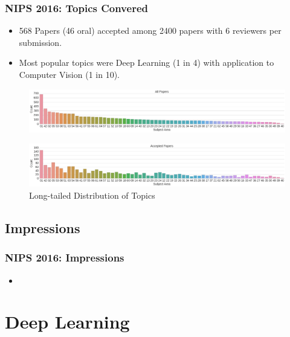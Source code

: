 \documentclass[11pt,
               hyperref={colorlinks,citecolor=pink,linkcolor=red,urlcolor=blue}
               ]{beamer}
\begin{document}
  \begin{frame}
    \frametitle{NIPS 2016: Topics Convered}

    \begin{itemize}
      \item 568 Papers (46 oral) accepted among 2400 papers with 6 reviewers per submission.
      \item Most popular topics were Deep Learning (1 in 4) with application to Computer Vision (1 in 10).
    \end{itemize}

    \begin{figure}
      \centering
      \includegraphics[width=\textwidth]{nipsTopics1.png}
    \end{figure}

    \begin{figure}
      \centering
      \includegraphics[width=\textwidth]{nipsTopics2.png}
      \caption*{Long-tailed Distribution of Topics \footnotemark[1]}
    \end{figure}

  \end{frame}

  \subsection{Impressions}

  \begin{frame}
    \frametitle{NIPS 2016: Impressions}

    \begin{itemize}
      \item
    \end{itemize}

  \end{frame}

  \section{Deep Learning}
\end{document}

